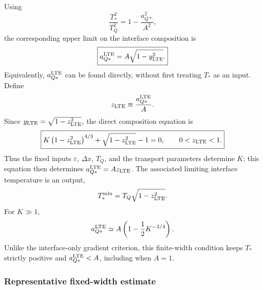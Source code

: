 Using
\begin{equation}
\frac{T_*^2}{T_Q^2}
=
1-\frac{a_{Q*}^2}{A^2},
\end{equation}
the corresponding upper limit on the interface composition is
\begin{equation}
\boxed{
a_{Q*}^{\rm LTE}
=
A\sqrt{1-y_{\rm LTE}^2}.
}
\end{equation}
Equivalently, \(a_{Q*}^{\rm LTE}\) can be found directly, without first
treating \(T_*\) as an input.  Define
\begin{equation}
z_{\rm LTE}
\equiv
\frac{a_{Q*}^{\rm LTE}}{A}.
\end{equation}
Since \(y_{\rm LTE}=\sqrt{1-z_{\rm LTE}^2}\), the direct composition equation
is
\begin{equation}
\boxed{
K\left(1-z_{\rm LTE}^2\right)^{4/3}
+
\sqrt{1-z_{\rm LTE}^2}
-1
=0,
\qquad
0<z_{\rm LTE}<1.
}
\end{equation}
Thus the fixed inputs \(\varepsilon\), \(\Delta x\), \(T_Q\), and the transport
parameters determine \(K\); this equation then determines
\(a_{Q*}^{\rm LTE}=Az_{\rm LTE}\).  The associated limiting interface
temperature is an output,
\begin{equation}
T_*^{\rm min}
=
T_Q\sqrt{1-z_{\rm LTE}^2}.
\end{equation}
For \(K\gg1\),
\begin{equation}
a_{Q*}^{\rm LTE}
\simeq
A\left(1-\frac{1}{2}K^{-3/4}\right).
\end{equation}
Unlike the interface-only gradient criterion, this finite-width condition
keeps \(T_*\) strictly positive and \(a_{Q*}^{\rm LTE}<A\), including when
\(A=1\).

\subsubsection{Representative fixed-width estimate}

